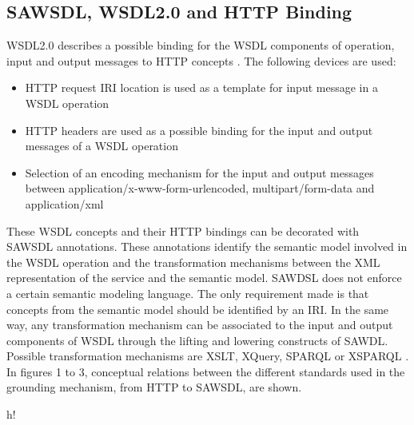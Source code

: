 \subsection{SAWSDL, WSDL2.0 and HTTP Binding}
WSDL2.0 describes a possible binding for the WSDL components of operation, input and output messages to HTTP concepts \cite{w3cwsdl2}. The following devices are used:
\begin{itemize}
  \item HTTP request IRI location is used as a template for input message in a WSDL operation
  \item HTTP headers are used as a possible binding for the input and output messages of a WSDL operation
  \item Selection of an encoding mechanism for the input and output messages between application/x-www-form-urlencoded, multipart/form-data and application/xml
\end{itemize}
These WSDL concepts and their HTTP bindings can be decorated with SAWSDL annotations. These annotations identify the semantic model involved in the WSDL operation and the transformation mechanisms between the XML representation of the service and the semantic model. SAWDSL does not enforce a certain semantic modeling language. The only requirement made is that concepts from the semantic model should be identified by an IRI. In the same way, any transformation mechanism can be associated to the input and output components of WSDL through the lifting and lowering constructs of SAWDL. Possible transformation mechanisms are XSLT, XQuery, SPARQL \cite{sparql} or XSPARQL \cite{xsparql}.
In figures 1 to 3, conceptual relations between the different standards used in the grounding mechanism, from HTTP to SAWSDL, are shown.


\begin{table}{h!}
\noindent{}
\caption{WSDL to HTTP mapping}
\end{table}


